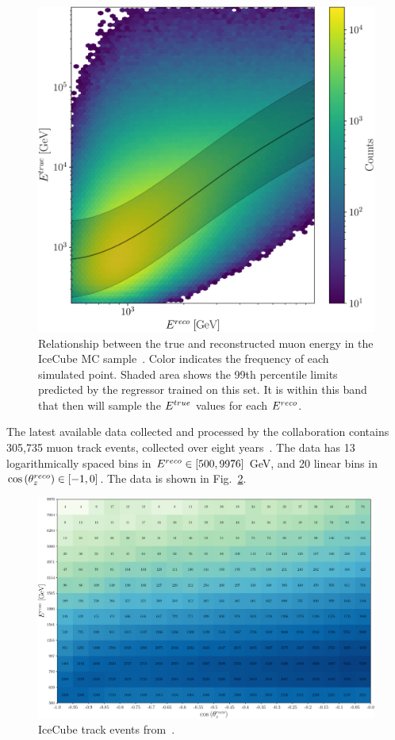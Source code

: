 \begin{figure}[ht]
    \begin{center}
       \includegraphics[width=0.7\linewidth]{figures/IC_MC_gpr.pdf}
    \end{center}
    \caption{Relationship between the true and reconstructed muon energy in the IceCube MC sample~\cite{IC2016}.
    Color indicates the frequency of each simulated point.
    Shaded area shows the 99th percentile limits predicted by the regressor trained on this set. It is within this band 
    that then will sample the $E^{true}$ values for each $E^{reco}$.}\label{fig:IC_MC_gpr}
 \end{figure}

The latest available data collected and processed by the collaboration contains 305,735 muon track events, collected over eight years~\cite{IC2020}. 
The data has 13 logarithmically spaced bins in $E^{reco} \in [500,9976]$ \si{\GeV}, and 20 linear bins in $\cos{(\theta_z^{reco})} \in [-1,0]$. The data is shown in Fig.~\ref{fig:IC_data}.

\begin{figure}[ht]
    \centering
    \includegraphics[scale=0.4]{figures/IC_data.pdf}
    \caption{IceCube track events from~\cite{IC2020}.}\label{fig:IC_data}
\end{figure}

